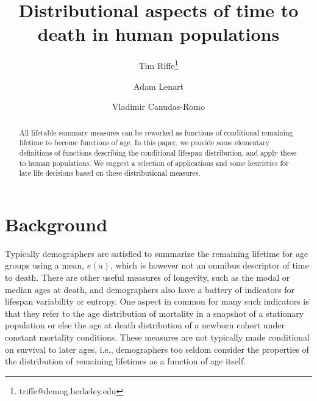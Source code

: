 \documentclass{article}
\begin{document}
\title{Distributional aspects of time to death in human populations}

\author[1]{Tim Riffe\thanks{triffe@demog.berkeley.edu}}
\author[2,3]{Adam Lenart}
\author[2,3]{Vladimir Canudas-Romo}

\maketitle

\begin{abstract}
All lifetable summary measures can be reworked as functions of conditional
remaining lifetime to become functions of age. In this paper, we provide
some elementary definitions of functions describing the conditional lifespan
distribution, and apply these to human populations.
We suggest a selection of applications and some heuristics for late life
decisions based on these distributional measures.
\end{abstract}

\section*{Background}

Typically demographers are satisfied to summarize the remaining lifetime for age
groups using a mean, $e(a)$, which is however not an omnibus descriptor of time
to death. There are other useful measures of longevity, such as
the modal or median ages at death, and demographers also have a battery of
indicators for lifespan variability or entropy. One aspect in common for many
such indicators is that they refer to the age distribution of mortality in a snapshot of a stationary population or else the age at death distribution of a newborn cohort under constant mortality
conditions. These measures are not typically made conditional on survival to
later ages, i.e., demographers too seldom consider the properties of the
distribution of remaining lifetimes as a function of age itself. 
\end{document}
